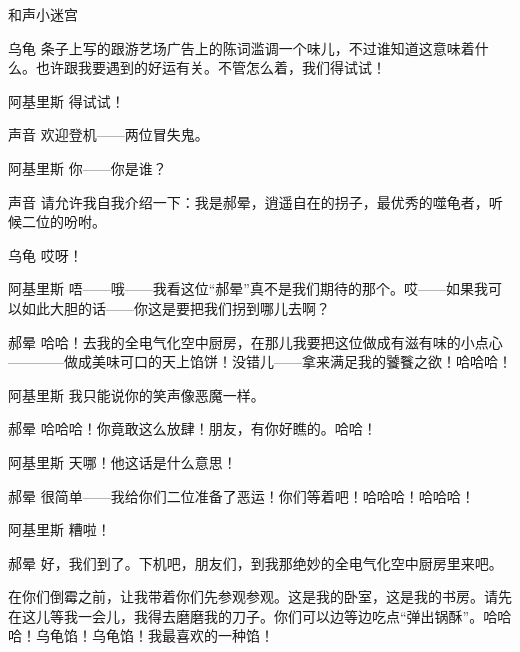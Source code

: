 \begin{dialog}{和声小迷宫}
\begin{dialogue}
\item[乌龟]条子上写的跟游艺场广告上的陈词滥调一个味儿，不过谁知道这意味着什么。也许跟我要遇到的好运有关。不管怎么着，我们得试试！

\item[阿基里斯]得试试！


\item[声音]欢迎登机——两位冒失鬼。

\item[阿基里斯]你——你是谁？

\item[声音]请允许我自我介绍一下：我是郝晕，逍遥自在的拐子，最优秀的噬龟者，听候二位的吩咐。

\item[乌龟]哎呀！

\item[阿基里斯\dlnote{（对他的朋友低语）}]唔——哦——我看这位“郝晕”真不是我们期待的那个。哎——如果我可以如此大胆的话——你这是要把我们拐到哪儿去啊？

\item[郝晕]哈哈！去我的全电气化空中厨房，在那儿我要把这位做成有滋有味的小点心————做成美味可口的天上馅饼！没错儿——拿来满足我的饕餮之欲！哈哈哈！

\item[阿基里斯]我只能说你的笑声像恶魔一样。

\item[郝晕]哈哈哈！你竟敢这么放肆！朋友，有你好瞧的。哈哈！

\item[阿基里斯]天哪！他这话是什么意思！

\item[郝晕]很简单——我给你们二位准备了恶运！你们等着吧！哈哈哈！哈哈哈！

\item[阿基里斯]糟啦！

\item[郝晕]好，我们到了。下机吧，朋友们，到我那绝妙的全电气化空中厨房里来吧。


在你们倒霉之前，让我带着你们先参观参观。这是我的卧室，这是我的书房。请先在这儿等我一会儿，我得去磨磨我的刀子。你们可以边等边吃点“弹出锅酥”。哈哈哈！乌龟馅！乌龟馅！我最喜欢的一种馅！


\end{dialogue}
\end{dialog}

